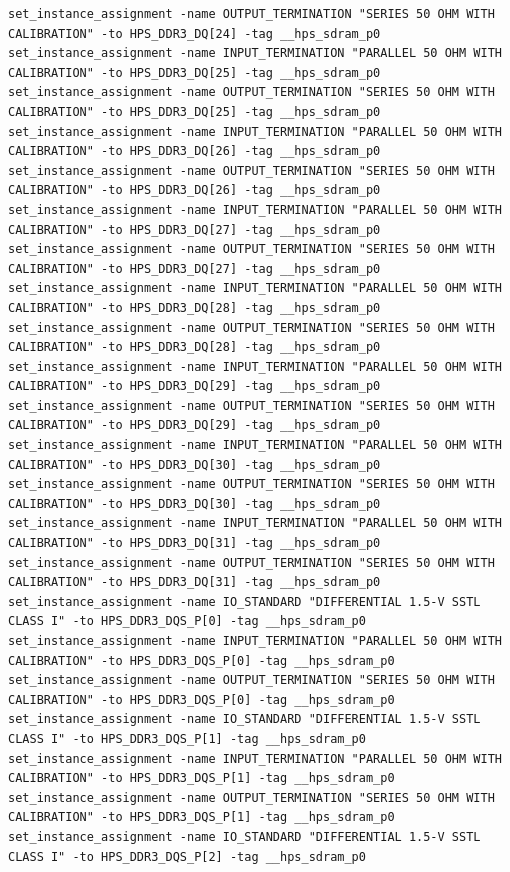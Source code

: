 \documentclass[conference]{IEEEtran}
\begin{document}
\begin{lstlisting}
set_instance_assignment -name OUTPUT_TERMINATION "SERIES 50 OHM WITH CALIBRATION" -to HPS_DDR3_DQ[24] -tag __hps_sdram_p0
set_instance_assignment -name INPUT_TERMINATION "PARALLEL 50 OHM WITH CALIBRATION" -to HPS_DDR3_DQ[25] -tag __hps_sdram_p0
set_instance_assignment -name OUTPUT_TERMINATION "SERIES 50 OHM WITH CALIBRATION" -to HPS_DDR3_DQ[25] -tag __hps_sdram_p0
set_instance_assignment -name INPUT_TERMINATION "PARALLEL 50 OHM WITH CALIBRATION" -to HPS_DDR3_DQ[26] -tag __hps_sdram_p0
set_instance_assignment -name OUTPUT_TERMINATION "SERIES 50 OHM WITH CALIBRATION" -to HPS_DDR3_DQ[26] -tag __hps_sdram_p0
set_instance_assignment -name INPUT_TERMINATION "PARALLEL 50 OHM WITH CALIBRATION" -to HPS_DDR3_DQ[27] -tag __hps_sdram_p0
set_instance_assignment -name OUTPUT_TERMINATION "SERIES 50 OHM WITH CALIBRATION" -to HPS_DDR3_DQ[27] -tag __hps_sdram_p0
set_instance_assignment -name INPUT_TERMINATION "PARALLEL 50 OHM WITH CALIBRATION" -to HPS_DDR3_DQ[28] -tag __hps_sdram_p0
set_instance_assignment -name OUTPUT_TERMINATION "SERIES 50 OHM WITH CALIBRATION" -to HPS_DDR3_DQ[28] -tag __hps_sdram_p0
set_instance_assignment -name INPUT_TERMINATION "PARALLEL 50 OHM WITH CALIBRATION" -to HPS_DDR3_DQ[29] -tag __hps_sdram_p0
set_instance_assignment -name OUTPUT_TERMINATION "SERIES 50 OHM WITH CALIBRATION" -to HPS_DDR3_DQ[29] -tag __hps_sdram_p0
set_instance_assignment -name INPUT_TERMINATION "PARALLEL 50 OHM WITH CALIBRATION" -to HPS_DDR3_DQ[30] -tag __hps_sdram_p0
set_instance_assignment -name OUTPUT_TERMINATION "SERIES 50 OHM WITH CALIBRATION" -to HPS_DDR3_DQ[30] -tag __hps_sdram_p0
set_instance_assignment -name INPUT_TERMINATION "PARALLEL 50 OHM WITH CALIBRATION" -to HPS_DDR3_DQ[31] -tag __hps_sdram_p0
set_instance_assignment -name OUTPUT_TERMINATION "SERIES 50 OHM WITH CALIBRATION" -to HPS_DDR3_DQ[31] -tag __hps_sdram_p0
set_instance_assignment -name IO_STANDARD "DIFFERENTIAL 1.5-V SSTL CLASS I" -to HPS_DDR3_DQS_P[0] -tag __hps_sdram_p0
set_instance_assignment -name INPUT_TERMINATION "PARALLEL 50 OHM WITH CALIBRATION" -to HPS_DDR3_DQS_P[0] -tag __hps_sdram_p0
set_instance_assignment -name OUTPUT_TERMINATION "SERIES 50 OHM WITH CALIBRATION" -to HPS_DDR3_DQS_P[0] -tag __hps_sdram_p0
set_instance_assignment -name IO_STANDARD "DIFFERENTIAL 1.5-V SSTL CLASS I" -to HPS_DDR3_DQS_P[1] -tag __hps_sdram_p0
set_instance_assignment -name INPUT_TERMINATION "PARALLEL 50 OHM WITH CALIBRATION" -to HPS_DDR3_DQS_P[1] -tag __hps_sdram_p0
set_instance_assignment -name OUTPUT_TERMINATION "SERIES 50 OHM WITH CALIBRATION" -to HPS_DDR3_DQS_P[1] -tag __hps_sdram_p0
set_instance_assignment -name IO_STANDARD "DIFFERENTIAL 1.5-V SSTL CLASS I" -to HPS_DDR3_DQS_P[2] -tag __hps_sdram_p0

\end{lstlisting}
\end{document}
